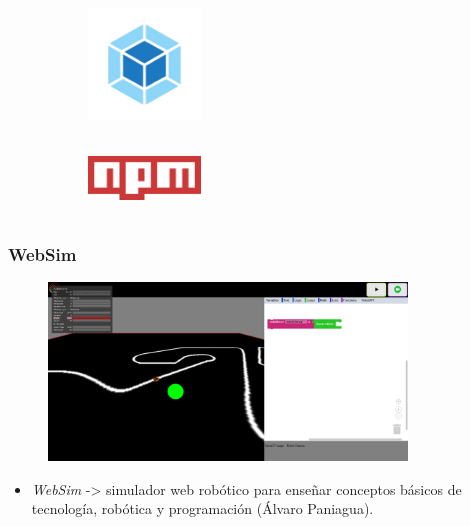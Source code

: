 \documentclass[xcolor={table}]{beamer}
\begin{document}
\begin{frame}
\begin{figure}[H]
\begin{subfigure}{\textwidth}
                \label{fig:figure2_7}
                \end{subfigure}\hfill
                \begin{subfigure}{\textwidth}                      \includegraphics[width=3cm, height=3cm]{img/webpack.jpeg}
                    \label{fig:figure2_9}
                    \end{subfigure}\hfill
                    \begin{subfigure}{\textwidth}
                        \includegraphics[width=3cm, height=2cm]{img/npm.png}
                    \label{fig:figure2_8}
                    \end{subfigure}\hfill
                    \label{fig:herramientas}
                    \end{figure}
        \end{frame}
        
        
	\begin{frame}
	\frametitle{WebSim}
	    \begin{figure}
	        \centering
	        \includegraphics[width=0.85\textwidth]{img/interfaz-websim.png}
	        \label{fig:websim}
	    \end{figure}
	    \begin{itemize}
            \begin{itemize}
    	    \item \textit{WebSim} -> simulador web robótico  para enseñar conceptos básicos de tecnología, robótica y programación (Álvaro Paniagua).
	     \end{itemize}{}
	\end{itemize}
\end{frame}
		
\end{document}
